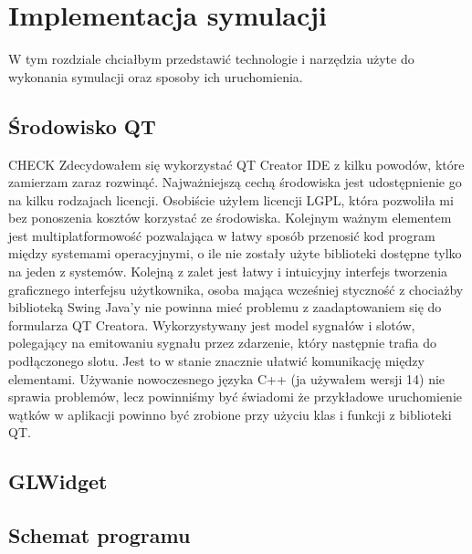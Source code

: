 \chapter{Implementacja symulacji}
\label{cha:implementacja}

W tym rozdziale chciałbym przedstawić technologie i narzędzia użyte do wykonania symulacji oraz sposoby ich uruchomienia.


\section{Środowisko QT}
\label{sec:qt}
{\color{red} CHECK}
Zdecydowałem się wykorzystać QT Creator IDE z kilku powodów, które zamierzam zaraz rozwinąć. Najważniejszą cechą środowiska jest udostępnienie go na kilku rodzajach licencji. Osobiście użyłem licencji LGPL, która pozwoliła mi bez ponoszenia kosztów korzystać ze środowiska. Kolejnym ważnym elementem jest multiplatformowość pozwalająca w łatwy sposób przenosić kod program między systemami operacyjnymi, o ile nie zostały użyte biblioteki dostępne tylko na jeden z systemów. Kolejną z zalet jest łatwy i intuicyjny interfejs tworzenia graficznego interfejsu użytkownika, osoba mająca wcześniej styczność z chociażby biblioteką Swing Java'y nie powinna mieć problemu z zaadaptowaniem się do  formularza QT Creatora. Wykorzystywany jest model sygnałów i slotów, polegający na emitowaniu sygnału przez zdarzenie, który następnie trafia do podłączonego slotu. Jest to w stanie znacznie ułatwić komunikację między elementami. Używanie nowoczesnego języka C++ (ja używałem wersji 14) nie sprawia problemów, lecz powinniśmy być świadomi że przykładowe uruchomienie wątków w aplikacji powinno być zrobione przy użyciu klas i funkcji z biblioteki QT.


\section{GLWidget}
\label{sec:glwidget}


\section{Schemat programu}
\label{sec::schemat}


